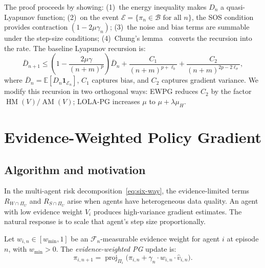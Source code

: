 The proof proceeds by showing: (1)~the energy inequality makes $D_n$ a quasi-Lyapunov function; (2)~on the event $\mathcal{E} = \{\pi_n \in \mathcal{B} \text{ for all } n\}$, the SOS condition provides contraction $(1 - 2\mu\gamma_n)$; (3)~the noise and bias terms are summable under the step-size conditions; (4)~Chung's lemma~\cite[Appendix~B]{giannou2022} converts the recursion into the rate. The baseline Lyapunov recursion is:
\begin{equation}
\label{eq:baseline-recursion}
    \bar{D}_{n+1} \leq \left(1 - \frac{2\mu\gamma}{(n+m)^p}\right) \bar{D}_n + \frac{C_1}{(n+m)^{p+\ell_b}} + \frac{C_2}{(n+m)^{2p-2\ell_\sigma}},
\end{equation}
where $\bar{D}_n = \mathbb{E}[D_n \mathbf{1}_{\mathcal{E}_n}]$, $C_1$ captures bias, and $C_2$ captures gradient variance. We modify this recursion in two orthogonal ways: EWPG reduces $C_2$ by the factor $\operatorname{HM}(V)/\operatorname{AM}(V)$; LOLA-PG increases $\mu$ to $\mu + \lambda\mu_H$.


\section{Evidence-Weighted Policy Gradient}
\label{sec:ewpg}

\subsection{Algorithm and motivation}

In the multi-agent risk decomposition~\eqref{eq:six-way}, the evidence-limited terms $R_{W \cap \Pi_U}$ and $R_{S \cap \Pi_U}$ arise when agents have heterogeneous data quality. An agent with low evidence weight $V_i$ produces high-variance gradient estimates. The natural response is to scale that agent's step size proportionally.

\begin{definition}
\label{def:ewpg-ch3}
Let $w_{i,n} \in [w_{\min}, 1]$ be an $\mathcal{F}_n$-measurable evidence weight for agent $i$ at episode $n$, with $w_{\min} > 0$. The \emph{evidence-weighted PG} update is:
\begin{equation}
\label{eq:ewpg-ch3}
\tag{EWPG}
    \pi_{i,n+1} = \operatorname{proj}_{\Pi_i}\bigl(\pi_{i,n} + \gamma_n \cdot w_{i,n} \cdot \hat{v}_{i,n}\bigr).
\end{equation}
\end{definition}

